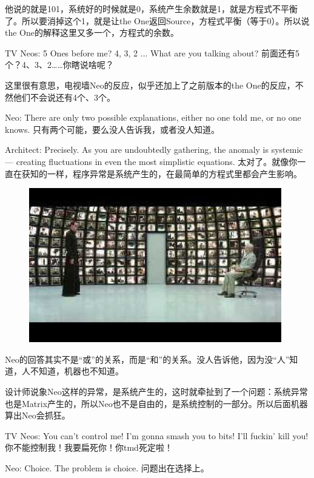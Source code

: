 \documentclass{ctexart}
\begin{document}
他说的就是101，系统好的时候就是0，系统产生余数就是1，就是方程式不平衡了。所以要消掉这个1，就是让the One返回Source，方程式平衡（等于0）。所以说the One的解释这里又多一个，方程式的余数。

TV Neos: 5 Ones before me? 4, 3, 2 ... What are you talking about? 前面还有5个？4、3、2……你瞎说啥呢？

这里很有意思，电视墙Neo的反应，似乎还加上了之前版本的the One的反应，不然他们不会说还有4个、3个。

Neo: There are only two possible explanations, either no one told me, or no one knows. 只有两个可能，要么没人告诉我，或者没人知道。

Architect: Precisely. As you are undoubtedly gathering, the anomaly is systemic --- creating fluctuations in even the most simplistic equations. 太对了。就像你一直在获知的一样，程序异常是系统产生的，在最简单的方程式里都会产生影响。

\begin{figure}[htb]
\centering
\includegraphics[width=0.5\linewidth]{fig/read_reloaded-161}
\end{figure}

Neo的回答其实不是“或”的关系，而是“和”的关系。没人告诉他，因为没“人”知道，人不知道，机器也不知道。

设计师说象Neo这样的异常，是系统产生的，这时就牵扯到了一个问题：系统异常也是Matrix产生的，所以Neo也不是自由的，是系统控制的一部分。所以后面机器算出Neo会抓狂。

TV Neos: You can’t control me! I’m gonna smash you to bits! I’ll fuckin’ kill you! 你不能控制我！我要扁死你！你tmd死定啦！

Neo: Choice. The problem is choice. 问题出在选择上。
\end{document}
